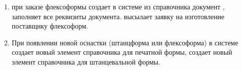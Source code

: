 \begin{enumerate}
\item \tehnolog	при заказе флексоформы создает в системе \gofro из справочника  документ , заполняет все реквизиты документа.  \tehnolog высылает заявку на изготовление  поставщику флексоформ.
\item	При появлении новой оснастки (штанцформа или флексоформа)  в системе \gofro \tehnolog создает новый элемент справочника  для печатной формы, \tehnolog создает новый элемент справочника  для штанцевальной формы.

\end{enumerate}